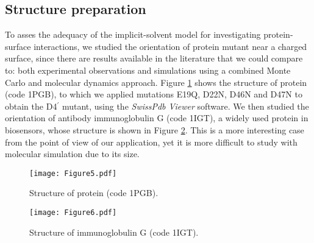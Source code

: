 \subsection{Structure preparation}

To asses the adequacy of the implicit-solvent model for investigating protein-surface interactions, we studied the orientation of protein \gb mutant near a charged surface, since there are results available in the literature that we could compare to: both experimental observations \cite{BaioWeidnerBaughGambleStaytonCastner2012} and simulations using a combined Monte Carlo and molecular dynamics approach.\cite{LiuLiaoZhou2013} Figure \ref{fig:1pgb} shows the structure of protein \gb (\pdb code {\small 1PGB}), to which we applied mutations {\small E19Q}, {\small D22N}, {\small D46N} and {\small D47N} to obtain the {\small D4$^\prime$} mutant, using the \textsl{SwissPdb Viewer} software.\cite{GuexPeitsch1997}
We then studied the orientation of antibody immunoglobulin G (\pdb code {\small 1IGT}), a widely used protein in biosensors, whose structure is shown in Figure \ref{fig:1igt}. This is a more interesting case from the point of view of our application, yet it is more difficult to study with molecular simulation due to its size.

\begin{figure}%
   \centering
   \texttt{[image: Figure5.pdf]}
   \caption{Structure of protein \gb (\pdb code {\small 1PGB}).}
   \label{fig:1pgb}
\end{figure}

\begin{figure}%
   \centering
   \texttt{[image: Figure6.pdf]}
   \caption{Structure of immunoglobulin G (\pdb code {\small 1IGT}).}
   \label{fig:1igt}
\end{figure}

